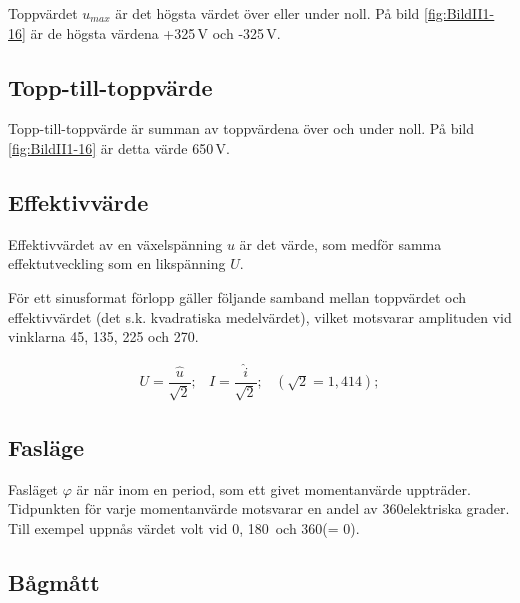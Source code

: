Toppvärdet \(u_{max}\) är det högsta värdet över eller under noll.
På bild \ref{fig:BildII1-16} är de högsta värdena +325\,V och -325\,V.

\subsection{Topp-till-toppvärde}

Topp-till-toppvärde är summan av toppvärdena över och under noll.
På bild \ref{fig:BildII1-16} är detta värde 650\,V.

\subsection{Effektivvärde}

Effektivvärdet av en växelspänning \(u\) är det värde, som medför samma
effektutveckling som en likspänning \(U\).

För ett sinusformat förlopp gäller följande samband mellan toppvärdet
och effektivvärdet (det s.k. kvadratiska medelvärdet), vilket
motsvarar amplituden vid vinklarna 45, 135, 225 och 270\degree.

\begin{equation*}
  \begin{array}{lllll}
    U=\dfrac{\hat{u}}{\sqrt{2}}; & I=\dfrac{\hat{i}}{\sqrt{2}}; & (\sqrt{2} = 1,414);
  \end{array}
\end{equation*}

\subsection{Fasläge}

Fasläget \(\varphi\) är när inom en period, som ett givet momentanvärde
uppträder.
Tidpunkten för varje momentanvärde motsvarar en andel av 360\degree elektriska
grader.
Till exempel uppnås värdet volt vid 0\degree, 180\degree~och 360\degree (= 0\degree).

\subsection{Bågmått}

